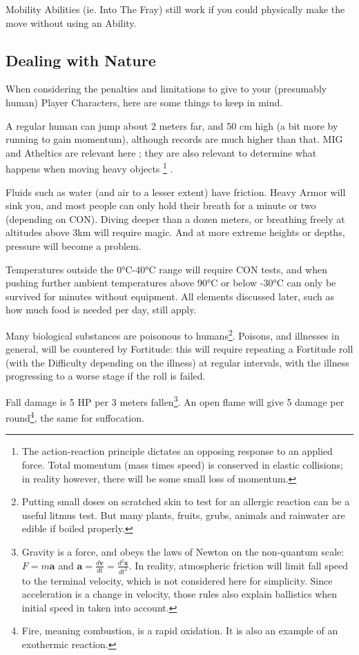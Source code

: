 Mobility Abilities (ie. Into The Fray) still work if you could physically make the move without using an Ability.


\subsection{Dealing with Nature}

When considering the penalties and limitations to give to your (presumably human) Player Characters, here are some things to keep in mind.

A regular human can jump about 2 meters far, and 50 cm high (a bit more by running to gain momentum), although records are much higher than that. MIG and Atheltics are relevant here ; they are also relevant to determine what happens when moving heavy objects
\footnote{The action-reaction principle dictates an opposing response to an applied force. Total momentum (mass times speed) is conserved in elastic collisions; in reality however, there will be some small loss of momentum.}
.

Fluids such as water (and air to a lesser extent) have friction. Heavy Armor will sink you, and most people can only hold their breath for a minute or two (depending on CON). Diving deeper than a dozen meters, or breathing freely at altitudes above 3km will require magic. And at more extreme heights or depths, pressure will become a problem.

Temperatures outside the 0°C-40°C range will require CON tests, and when pushing further ambient temperatures above 90°C or below -30°C can only be survived for minutes without equipment. All elements discussed later, such as how much food is needed per day, still apply.

Many biological substances are poisonous to humans\footnote{Putting small doses on scratched skin to test for an allergic reaction can be a useful litmus test. But many plants, fruits, grubs, animals and rainwater are edible if boiled properly.}. Poisons, and illnesses in general, will be countered by Fortitude: this will require repeating a Fortitude roll (with the Difficulty depending on the illness) at regular intervals, with the illness progressing to a worse stage if the roll is failed.

Fall damage is 5 HP per 3 meters fallen\footnote{Gravity is a force, and obeys the laws of Newton on the non-quantum scale: $F=m\bm{a}$ and $\bm{a} = \frac{d\bm{v}}{dt}=\frac{d^2 \bm{x}}{dt^2}$. In reality, atmospheric friction will limit fall speed to the terminal velocity, which is not considered here for simplicity. Since acceleration is a change in velocity, those rules also explain ballistics when initial speed in taken into account.}. An open flame will give 5 damage per round\footnote{Fire, meaning combustion, is a rapid oxidation. It is also an example of an exothermic reaction.}, the same for suffocation.


